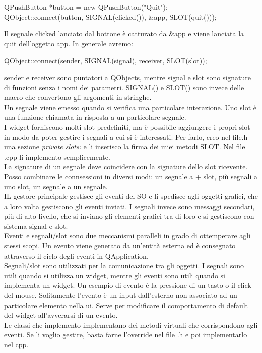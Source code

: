\begin{tcolorbox}
QPushButton *button = new QPushButton("Quit");\\
QObject::connect(button, SIGNAL(clicked()), \&app, SLOT(quit()));
\end{tcolorbox}

Il segnale clicked lanciato dal bottone è catturato da \&app e viene lanciata la quit dell'oggetto app. In generale avremo:\\

\begin{tcolorbox}
QObject::connect(sender, SIGNAL(signal), receiver, SLOT(slot));
\end{tcolorbox}

sender e receiver sono puntatori a QObjects, mentre signal e slot sono signature di funzioni senza i nomi dei parametri. SIGNAL() e SLOT() sono invece delle macro che convertono gli argomenti in stringhe.\\

Un segnale viene emesso quando si verifica una particolare interazione.
Uno slot è una funzione chiamata in risposta a un particolare segnale.\\
I widget forniscono molti slot predefiniti, ma è possibile aggiungere i propri slot in modo da poter gestire i segnali a cui si è interessati. Per farlo, creo nel file.h una sezione \textit{private slots:} e li inserisco la firma dei miei metodi SLOT. Nel file .cpp li implemento semplicemente.\\
La signature di un segnale deve coincidere con la signature dello slot ricevente. Posso combinare le connsessioni in diversi modi: un segnale a + slot, più segnali a uno slot, un segnale a un segnale.\\
IL gestore principale gestisce gli eventi del SO e li spedisce agli oggetti grafici, che a loro volta gestiscono gli eventi inviati.
I segnali invece sono messaggi secondari, più di alto livello, che si inviano gli elementi grafici tra di loro e si gestiscono con sistema signal e slot.\\
Eventi e segnali/slot sono due meccanismi paralleli in grado di ottemperare agli stessi scopi. Un evento viene generato da un'entità esterna ed è consegnato attraverso il ciclo degli eventi in QApplication.\\
Segnali/slot sono utilizzati per la comunicazione tra gli oggetti. I segnali sono utili quando si utilizza un widget, mentre gli eventi sono utili quando si implementa un widget. Un esempio di evento è la pressione di un tasto o il click del mouse. 
Solitamente l'evento è un input dall'esterno non associato ad un particolare elemento nella ui. Serve per modificare il comportamento di default del widget all'avverarsi di un evento.\\
Le classi che implemento implementano dei metodi virtuali che corrispondono agli eventi. Se li voglio gestire, basta farne l'override nel file .h e poi implementarlo nel cpp.\\

